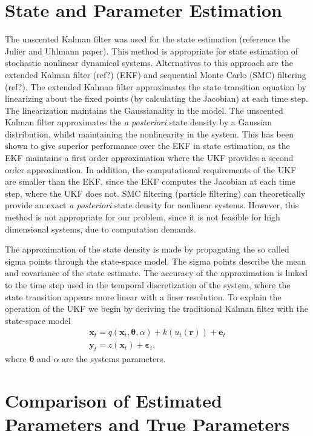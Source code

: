 \documentclass[onecolumn,draftcls]{IEEEtran}
\begin{document}
\section{State and Parameter Estimation}
The unscented Kalman filter was used for the state estimation (reference the Julier and Uhlmann paper). This method is appropriate for state estimation of stochastic nonlinear dynamical systems. Alternatives to this approach are the extended Kalman filter (ref?) (EKF) and sequential Monte Carlo (SMC) filtering (ref?). The extended Kalman filter approximates the state transition equation by linearizing about the fixed points (by calculating the Jacobian) at each time step. The linearization maintains the Gaussianality in the model. The unscented Kalman filter approximates the \emph{a posteriori} state density by a Gaussian distribution, whilst maintaining the nonlinearity in the system. This has been shown to give superior performance over the EKF in state estimation, as the EKF maintains a first order approximation where the UKF provides a second order approximation. In addition, the computational requirements of the UKF are smaller than the EKF, since the EKF computes the Jacobian at each time step, where the UKF does not. SMC filtering (particle filtering) can theoretically provide an exact \emph{a posteriori} state density for nonlinear systems. However, this method is not appropriate for our problem, since it is not feasible for high dimensional systems, due to computation demands.

The approximation of the state density is made by propagating the so called sigma points through the state-space model. The sigma points describe the mean and covariance of the state estimate. The accuracy of the approximation is linked to the time step used in the temporal discretization of the system, where the state transition appears more linear with a finer resolution. To explain the operation of the UKF we begin by deriving the traditional Kalman filter with the state-space model
\begin{eqnarray}
	\mathbf{x}_t = q(\mathbf{x}_t,\boldsymbol{\theta},\alpha) + k\left(u_t\left(\mathbf{r}\right)\right) + \mathbf{e}_t \\
	\mathbf{y}_t = z(\mathbf{x}_t) + \boldsymbol{\varepsilon}_t,
\end{eqnarray}
where $\boldsymbol{\theta}$ and $\alpha$ are the systems parameters. 

\section{Comparison of Estimated Parameters and True Parameters}
\end{document}
